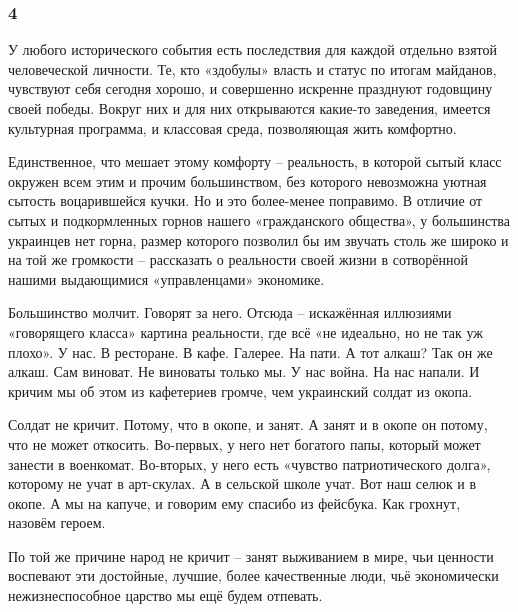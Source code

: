  
 
 
 
 
\subsubsection{4}
\label{sec:22_11_2021.fb.uljanov_anatolij.1.maidan.4}

У любого исторического события есть последствия для каждой отдельно взятой
человеческой личности. Те, кто «здобулы» власть и статус по итогам майданов,
чувствуют себя сегодня хорошо, и совершенно искренне празднуют годовщину своей
победы. Вокруг них и для них открываются какие-то заведения, имеется культурная
программа, и классовая среда, позволяющая жить комфортно.

Единственное, что мешает этому комфорту – реальность, в которой сытый класс
окружен всем этим  и прочим большинством, без
которого невозможна уютная сытость воцарившейся кучки. Но и это более-менее
поправимо. В отличие от сытых и подкормленных горнов нашего «гражданского
общества», у большинства украинцев нет горна, размер которого позволил бы им
звучать столь же широко и на той же громкости – рассказать о реальности своей
жизни в сотворённой нашими выдающимися «управленцами» экономике.

Большинство молчит. Говорят за него. Отсюда – искажённая иллюзиями «говорящего
класса» картина реальности, где всё «не идеально, но не так уж плохо». У нас. В
ресторане. В кафе. Галерее. На пати. А тот алкаш? Так он же алкаш. Сам виноват.
Не виноваты только мы. У нас война. На нас напали. И кричим мы об этом из
кафетериев громче, чем украинский солдат из окопа.

Солдат не кричит. Потому, что в окопе, и занят. А занят и в окопе он потому,
что не может откосить. Во-первых, у него нет богатого папы, который может
занести в военкомат. Во-вторых, у него есть «чувство патриотического долга»,
которому не учат в арт-скулах. А в сельской школе учат. Вот наш селюк и в
окопе. А мы на капуче, и говорим ему спасибо из фейсбука. Как грохнут, назовём
героем.  

По той же причине народ не кричит – занят выживанием в мире, чьи ценности
воспевают эти достойные, лучшие, более качественные люди, чьё экономически
нежизнеспособное царство мы ещё будем отпевать.

